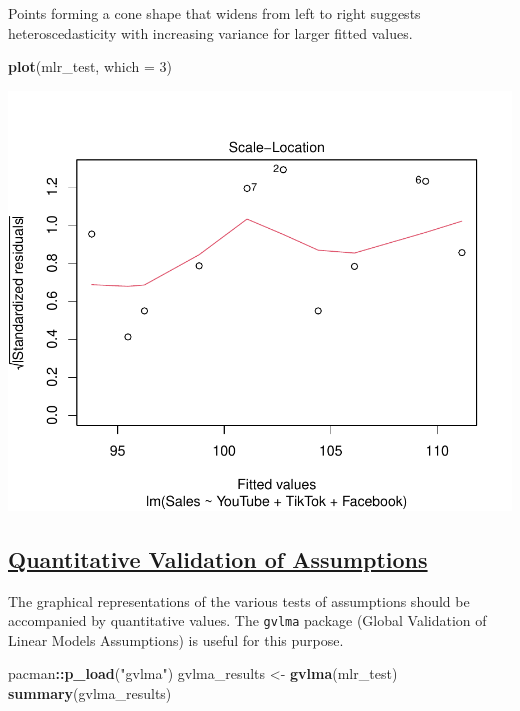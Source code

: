 \documentclass[
]{article}
\newenvironment{Shaded}{\begin{snugshade}}{\end{snugshade}}
\newcommand{\AttributeTok}[1]{\textcolor[rgb]{0.13,0.29,0.53}{#1}}
\newcommand{\DecValTok}[1]{\textcolor[rgb]{0.00,0.00,0.81}{#1}}
\newcommand{\FunctionTok}[1]{\textcolor[rgb]{0.13,0.29,0.53}{\textbf{#1}}}
\newcommand{\NormalTok}[1]{#1}
\newcommand{\OtherTok}[1]{\textcolor[rgb]{0.56,0.35,0.01}{#1}}
\newcommand{\SpecialCharTok}[1]{\textcolor[rgb]{0.81,0.36,0.00}{\textbf{#1}}}
\newcommand{\StringTok}[1]{\textcolor[rgb]{0.31,0.60,0.02}{#1}}
\begin{document}
Points forming a cone shape that widens from left to right suggests
heteroscedasticity with increasing variance for larger fitted values.

\begin{Shaded}
\begin{Highlighting}[]
\FunctionTok{plot}\NormalTok{(mlr\_test, }\AttributeTok{which =} \DecValTok{3}\NormalTok{)}
\end{Highlighting}
\end{Shaded}

\includegraphics{2_multiple_linear_regression_files/figure-latex/test_of_homoscedasticity-1.pdf}

\subsection{\texorpdfstring{\ul{\textbf{Quantitative Validation of
Assumptions}}}{Quantitative Validation of Assumptions}}\label{quantitative-validation-of-assumptions}

The graphical representations of the various tests of assumptions should
be accompanied by quantitative values. The \texttt{gvlma} package
(Global Validation of Linear Models Assumptions) is useful for this
purpose.

\begin{Shaded}
\begin{Highlighting}[]
\NormalTok{pacman}\SpecialCharTok{::}\FunctionTok{p\_load}\NormalTok{(}\StringTok{"gvlma"}\NormalTok{)}
\NormalTok{gvlma\_results }\OtherTok{\textless{}{-}} \FunctionTok{gvlma}\NormalTok{(mlr\_test)}
\FunctionTok{summary}\NormalTok{(gvlma\_results)}
\end{Highlighting}
\end{Shaded}
\end{document}
